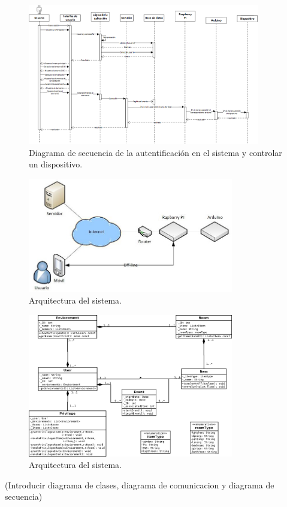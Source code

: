 \begin{figure}[h!]
	\centering
	\includegraphics[width=0.9\textwidth]{4.Disenio/Imagenes/DisenioEHC}
	\caption{Diagrama de secuencia de la autentificaci\'on en el sistema y controlar un dispositivo.}
	\label{fig:diagramaSecuencia}
\end{figure}

\begin{figure}
	\centering
	\includegraphics[width=0.8\textwidth]{4.Disenio/Imagenes/arquitectura}
	\caption{Arquitectura del sistema.}
	\label{fig:arquitectura}
\end{figure}


\begin{figure}
	\centering
	\includegraphics[width=0.8\textwidth]{4.Disenio/Imagenes/diagramaClase}
	\caption{Arquitectura del sistema.}
	\label{fig:diagramaClase}
\end{figure}



(Introducir diagrama de clases, diagrama de comunicacion y diagrama de secuencia)

